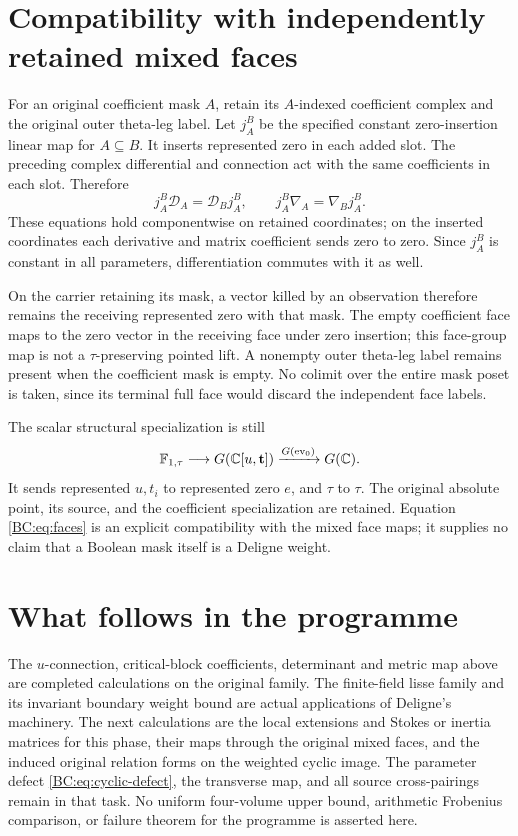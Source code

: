\section{Compatibility with independently retained mixed faces}

For an original coefficient mask $A$, retain its $A$-indexed coefficient
complex and the original outer theta-leg label.  Let
$j_A^B$ be the specified constant zero-insertion linear map for
$A\subseteq B$.  It inserts represented zero in each added slot.
The preceding complex differential and connection act with the same
coefficients in each slot.  Therefore
\begin{equation}
 j_A^B\mathcal D_A=\mathcal D_Bj_A^B,
 \qquad j_A^B\nabla_A=\nabla_Bj_A^B.
 \label{BC:eq:faces}
\end{equation}
These equations hold componentwise on retained coordinates; on the
inserted coordinates each derivative and matrix coefficient sends zero
to zero.  Since $j_A^B$ is constant in all parameters, differentiation
commutes with it as well.

On the carrier retaining its mask, a vector killed by an observation
therefore remains the receiving represented zero with that mask.
The empty coefficient face maps to the zero vector in the receiving
face under zero insertion; this face-group map is not a
$\tau$-preserving pointed lift.  A nonempty outer theta-leg label
remains present when the coefficient mask is empty.  No colimit over
the entire mask poset is taken, since its terminal full face would
discard the independent face labels.

The scalar structural specialization is still
\[
 \mathbb F_{1,\tau}\longrightarrow G(\mathbb C[u,\mathbf t])
       \xrightarrow{G(\operatorname{ev}_0)}G(\mathbb C).
\]
It sends represented $u,t_i$ to represented zero $e$, and $\tau$ to
$\tau$.  The original absolute point, its source, and the coefficient
specialization are retained.  Equation \eqref{BC:eq:faces} is an explicit
compatibility with the mixed face maps; it supplies no claim that a
Boolean mask itself is a Deligne weight.

\section{What follows in the programme}

The $u$-connection, critical-block coefficients, determinant and metric
map above are completed calculations on the original family.  The
finite-field lisse family and its invariant boundary weight bound are
actual applications of Deligne's machinery.  The next calculations
are the local extensions and Stokes or inertia matrices for this phase,
their maps through the original mixed faces, and the induced original
relation forms on the weighted cyclic image.  The parameter defect
\eqref{BC:eq:cyclic-defect}, the transverse map, and all source
cross-pairings remain in that task.  No uniform four-volume upper bound,
arithmetic Frobenius comparison, or failure theorem for the programme
is asserted here.

